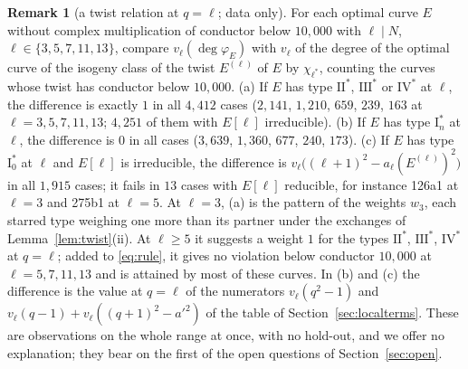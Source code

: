 \documentclass[11pt]{amsart}
\theoremstyle{definition}
\newtheorem{remark}[theorem]{Remark}
\newcommand{\degphi}{\deg\varphi_E}
\begin{document}
\begin{remark}[a twist relation at $q=\ell$; data only]\label{rem:oq1}
For each optimal curve $E$ without complex multiplication of conductor below $10{,}000$ with $\ell\mid N$, $\ell\in\{3,5,7,11,13\}$, compare $v_\ell(\degphi)$ with $v_\ell$ of the degree of the optimal curve of the isogeny class of the twist $E^{(\ell)}$ of $E$ by $\chi_{\ell^*}$, counting the curves whose twist has conductor below $10{,}000$. (a) If $E$ has type $\mathrm{II}^*$, $\mathrm{III}^*$ or $\mathrm{IV}^*$ at $\ell$, the difference is exactly $1$ in all $4{,}412$ cases ($2{,}141$, $1{,}210$, $659$, $239$, $163$ at $\ell=3,5,7,11,13$; $4{,}251$ of them with $E[\ell]$ irreducible). (b) If $E$ has type $\mathrm{I}_n^*$ at $\ell$, the difference is $0$ in all cases ($3{,}639$, $1{,}360$, $677$, $240$, $173$). (c) If $E$ has type $\mathrm{I}_0^*$ at $\ell$ and $E[\ell]$ is irreducible, the difference is $v_\ell\bigl((\ell+1)^2-a_\ell(E^{(\ell)})^2\bigr)$ in all $1{,}915$ cases; it fails in $13$ cases with $E[\ell]$ reducible, for instance 126a1 at $\ell=3$ and 275b1 at $\ell=5$. At $\ell=3$, (a) is the pattern of the weights $w_3$, each starred type weighing one more than its partner under the exchanges of Lemma~\ref{lem:twist}(ii). At $\ell\ge5$ it suggests a weight $1$ for the types $\mathrm{II}^*$, $\mathrm{III}^*$, $\mathrm{IV}^*$ at $q=\ell$; added to \eqref{eq:rule}, it gives no violation below conductor $10{,}000$ at $\ell=5,7,11,13$ and is attained by most of these curves. In (b) and (c) the difference is the value at $q=\ell$ of the numerators $v_\ell(q^2-1)$ and $v_\ell(q-1)+v_\ell((q+1)^2-a'^2)$ of the table of Section~\ref{sec:localterms}. These are observations on the whole range at once, with no hold-out, and we offer no explanation; they bear on the first of the open questions of Section~\ref{sec:open}.
\end{remark}
\end{document}

